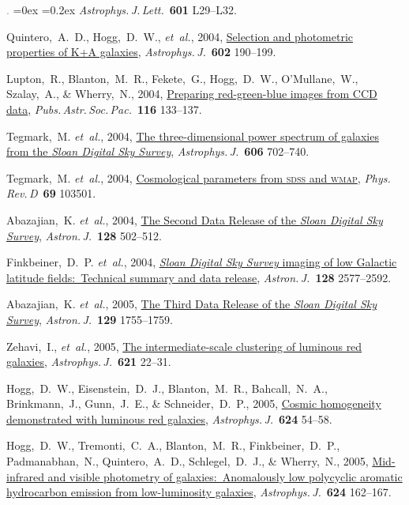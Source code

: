\documentclass[12pt,letterpaper]{article}
\newcommand{\latin}[1]{\textsl{#1}}
\newcommand{\etal}{\latin{et~al.}}
\newcommand{\project}[1]{\textsl{#1}}
\newcommand{\doi}[2]{\href{http://dx.doi.org/#1}{{#2}}}
\newcommand{\deemph}[1]{\textcolor{grey}{\footnotesize{#1}}}
\newcommand{\pubnumber}[1]{\deemph{{#1}.}}
\newcounter{refpubnum}
\newcommand{\hogglist}{%
    \rightmargin=0in
    \leftmargin=0.18in
    \topsep=0ex
    \partopsep=0pt
    \itemsep=0.2ex
    \parsep=0pt
    \itemindent=-1.0\leftmargin
    \listparindent=0.0\leftmargin
    \settowidth{\labelsep}{~}
    \usecounter{refpubnum}
  }
\begin{document}
\begin{list}{\pubnumber{\therefpubnum}}{\hogglist}
\textit{Astrophys.\,J.\,Lett.}\ \textbf{601} L29--L32.
\item\label{pub:Quintero2004}
Quintero,~A.~D., Hogg,~D.~W., \etal, 2004,
\doi{10.1086/380601}{Selection and photometric properties of K+A galaxies},
\textit{Astrophys.\,J.}\ \textbf{602} 190--199.
\item
Lupton,~R., Blanton,~M.~R., Fekete,~G., Hogg,~D.~W., O'Mullane,~W., Szalay,~A., \& Wherry,~N., 2004,
\doi{10.1086/382245}{Preparing red-green-blue images from CCD data},
\textit{Pubs.\,Astr.\,Soc.\,Pac.}\ \textbf{116} 133--137.
\item
Tegmark,~M. \etal, 2004,
\doi{10.1086/382125}{The three-dimensional power spectrum of galaxies from the \project{Sloan Digital Sky Survey}},
\textit{Astrophys.\,J.}\ \textbf{606} 702--740.
\item
Tegmark,~M. \etal, 2004,
\doi{10.1103/PhysRevD.69.103501}{Cosmological parameters from \textsc{sdss} and \textsc{wmap}},
\textit{Phys.\,Rev.\,D}\ \textbf{69} 103501.
\item
Abazajian,~K. \etal, 2004,
\doi{10.1086/421365}{The Second Data Release of the \project{Sloan Digital Sky Survey}},
\textit{Astron.\,J.}\ \textbf{128} 502--512.
\item
Finkbeiner,~D.~P. \etal, 2004,
\doi{10.1086/425050}{\project{Sloan Digital Sky Survey} imaging of low Galactic latitude fields:\ Technical summary and data release},
\textit{Astron.\,J.}\ \textbf{128} 2577--2592.
\item
Abazajian,~K. \etal, 2005,
\doi{10.1086/427544}{The Third Data Release of the \project{Sloan Digital Sky Survey}},
\textit{Astron.\,J.}\ \textbf{129} 1755--1759.
\item
Zehavi,~I., \etal, 2005,
\doi{10.1086/427495}{The intermediate-scale clustering of luminous red galaxies},
\textit{Astrophys.\,J.}\ \textbf{621} 22--31.
\item
Hogg,~D.~W., Eisenstein,~D.~J., Blanton,~M.~R., Bahcall,~N.~A., Brinkmann,~J., Gunn,~J.~E., \& Schneider,~D.~P., 2005,
\doi{10.1086/429084}{Cosmic homogeneity demonstrated with luminous red galaxies},
\textit{Astrophys.\,J.}\ \textbf{624} 54--58.
\item
Hogg,~D.~W., Tremonti,~C.~A., Blanton,~M.~R., Finkbeiner,~D.~P., Padmanabhan,~N., Quintero,~A.~D., Schlegel,~D.~J., \& Wherry,~N., 2005,
\doi{10.1086/429686}{Mid-infrared and visible photometry of galaxies:\ Anomalously low polycyclic aromatic hydrocarbon emission from low-luminosity galaxies},
\textit{Astrophys.\,J.}\ \textbf{624} 162--167.
\item

\end{list}
\end{document}
